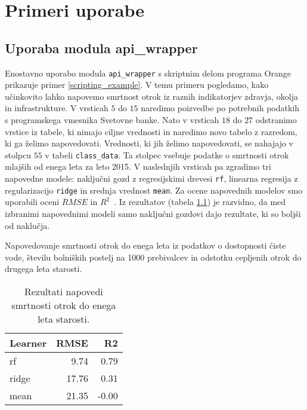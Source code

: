 \chapter{Primeri uporabe}


\section{Uporaba modula api\_wrapper}

Enostavno uporabo modula \verb|api_wrapper| s skriptnim delom programa Orange
prikazuje primer \ref{scripting_example}. V temu primeru pogledamo, kako
učinkovito lahko napovemo smrtnost otrok iz raznih indikatorjev zdravja,
okolja in infrastrukture. V vrsticah $5$ do $15$ naredimo poizvedbe po
potrebnih podatkih s programskega vmesnika Svetovne banke. Nato v vrsticah $18$
do $27$ odstranimo vrstice iz tabele, ki nimajo ciljne vrednosti in naredimo novo tabelo z
razredom, ki ga želimo napovedovati. Vrednosti, ki jih želimo napovedovati, se
nahajajo v stolpcu $55$ v tabeli \verb|class_data|. Ta stolpec vsebuje podatke
o smrtnosti otrok mlajših od enega leta za leto 2015. V naslednjih vrsticah
pa zgradimo tri napovedne modele: naključni gozd z
regresijskimi drevesi \verb|rf|, linearna regresija z regularizacijo 
\verb|ridge| in srednja vrednost \verb|mean|.
Za ocene napovednih modelov smo uporabili oceni
$RMSE$ in 
$R^2$~.
Iz rezultatov (tabela \ref{rezultati_skripte}) je razvidno, da med izbranimi 
napovednimi modeli samo naključni gozdovi dajo rezultate, ki so boljši od naklučja.

\begin{snippet}
\begin{center}

\end{center}
\cprotect
\caption{Napovedovanje smrtnosti otrok do enega leta iz podatkov o dostopnosti
  čiste vode, številu bolniških postelj na 1000 prebivalcev in odstotku
  cepljenih otrok do drugega leta starosti.}
\label{scripting_example}
\end{snippet} 

\begin{table}
\begin{center}

\begin{tabular}{l|r|r}
  Learner & RMSE & R2 \\ \hline
  rf & 9.74 & 0.79 \\
  ridge & 17.76 & 0.31 \\
  mean & 21.35 & -0.00
\end{tabular}
\end{center}
\cprotect
\caption{Rezultati napovedi smrtnosti otrok do enega leta starosti.}
\label{rezultati_skripte}
\end{table} 



